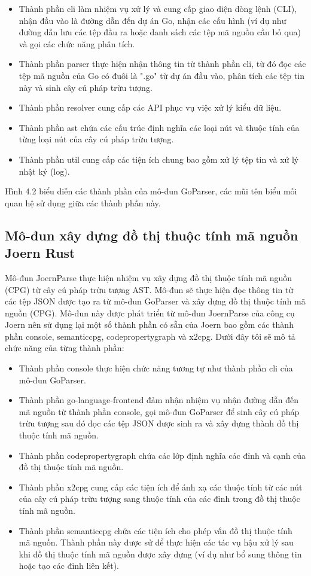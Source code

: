 \begin{itemize}
\item Thành phần cli làm nhiệm vụ xử lý và cung cấp giao diện dòng lệnh (CLI), nhận
đầu vào là đường dẫn đến dự án Go, nhận các cấu hình (ví dụ như đường dẫn lưu
các tệp đầu ra hoặc danh sách các tệp mã nguồn cần bỏ qua) và gọi các chức năng
phân tích.
\item Thành phần parser thực hiện nhận thông tin từ thành phần cli, từ đó đọc các tệp mã
nguồn của Go có đuôi là ".go" từ dự án đầu vào, phân tích các tệp tin này và sinh
cây cú pháp trừu tượng.
\item Thành phần resolver cung cấp các API phục vụ việc xử lý kiểu dữ liệu.
\item Thành phần ast chứa các cấu trúc định nghĩa các loại nút và thuộc tính của từng
loại nút của cây cú pháp trừu tượng.
\item Thành phần util cung cấp các tiện ích chung bao gồm xử lý tệp tin và xử lý nhật ký
(log).
\end{itemize}
Hình 4.2 biểu diễn các thành phần của mô-đun GoParser, các mũi tên biểu mối
quan hệ sử dụng giữa các thành phần này.

\subsection{Mô-đun xây dựng đồ thị thuộc tính mã nguồn Joern Rust}

Mô-đun JoernParse thực hiện nhiệm vụ xây dựng đồ thị thuộc tính mã nguồn (CPG)
từ cây cú pháp trừu tượng AST. Mô-đun sẽ thực hiện đọc thông tin từ các tệp JSON được
tạo ra từ mô-đun GoParser và xây dựng đồ thị thuộc tính mã nguồn (CPG). Mô-đun này
được phát triển từ mô-đun JoernParse của công cụ Joern nên sử dụng lại một số thành
phần có sẵn của Joern bao gồm các thành phần console, semanticcpg, codepropertygraph
và x2cpg. Dưới đây tôi sẽ mô tả chức năng của từng thành phần:
\begin{itemize}
\item Thành phần console thực hiện chức năng tương tự như thành phần cli của mô-đun
GoParser.
\item Thành phần go-language-frontend đảm nhận nhiệm vụ nhận đường dẫn đến mã nguồn từ thành phần console, gọi mô-đun GoParser để sinh cây cú pháp trừu tượng sau đó đọc các tệp JSON được sinh ra và xây dựng thành đồ thị thuộc tính mã nguồn.
\item Thành phần codepropertygraph chứa các lớp định nghĩa các đỉnh và cạnh của đồ thị thuộc tính mã nguồn.
\item Thành phần x2cpg cung cấp các tiện ích để ánh xạ các thuộc tính từ các nút của cây cú pháp trừu tượng sang thuộc tính của các đỉnh trong đồ thị thuộc tính mã nguồn.
\item Thành phần semanticcpg chứa các tiện ích cho phép vấn đồ thị thuộc tính mã nguồn. Thành phần này được sử để thực hiện các tác vụ hậu xử lý sau khi đồ thị thuộc tính mã nguồn được xây dựng (ví dụ như bổ sung thông tin hoặc tạo các đỉnh liên kết).
\end{itemize}

